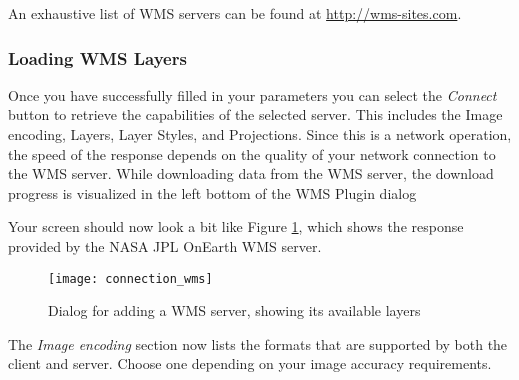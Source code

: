 An exhaustive list of WMS servers can be found at \url{http://wms-sites.com}.

\subsubsection{Loading WMS Layers}\label{sec:ogc-wms-layers}

Once you have successfully filled in your parameters you can select the \textsl{Connect}
button to retrieve the capabilities of the selected server.  This includes the Image encoding,
Layers, Layer Styles, and Projections.  Since this
is a network operation, the speed of the response depends on the quality of your network
connection to the WMS server. While downloading data from the WMS server, the download progress 
is visualized in the left bottom of the WMS Plugin dialog 

Your screen should now look a bit like Figure \ref{fig:connection_wms}, which shows the 
response provided by the NASA JPL OnEarth WMS server.

\begin{figure}[h]
  \begin{center}
  	\caption{Dialog for adding a WMS server, showing its available layers}\label{fig:connection_wms}
	\texttt{[image: connection\_wms]}
  \end{center}
\end{figure}


The \textsl{Image encoding} section now lists the formats that are supported by both
the client and server.  Choose one depending on your image accuracy requirements.

\begin{Tip}[h]\caption{\textsc{Image Encoding}}
\end{Tip}

